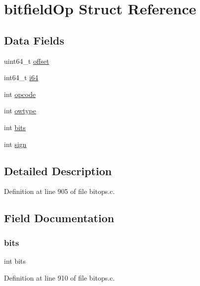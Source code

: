 \hypertarget{structbitfield_op}{}\section{bitfield\+Op Struct Reference}
\label{structbitfield_op}
\subsection*{Data Fields}
\begin{DoxyCompactItemize}
\item 
uint64\+\_\+t \hyperlink{structbitfield_op_a612bb2807d848cca89ea1437cceea886}{offset}
\item 
int64\+\_\+t \hyperlink{structbitfield_op_a35a9b0adab9f7ddb672b720854e419be}{i64}
\item 
int \hyperlink{structbitfield_op_aff3af4fae5174de7c7e40ec004999ca0}{opcode}
\item 
int \hyperlink{structbitfield_op_a9ed5a15ccd67f24e83836aa6b0830fd8}{owtype}
\item 
int \hyperlink{structbitfield_op_ad1e28a1a66a25529b0b61b9ca4e66d44}{bits}
\item 
int \hyperlink{structbitfield_op_abbeb8ae63622a7fef0b5a56bb91a1682}{sign}
\end{DoxyCompactItemize}


\subsection{Detailed Description}


Definition at line 905 of file bitops.\+c.



\subsection{Field Documentation}
\mbox{\label{structbitfield_op_ad1e28a1a66a25529b0b61b9ca4e66d44}} 
\subsubsection{\texorpdfstring{bits}{bits}}
{\footnotesize\ttfamily int bits}



Definition at line 910 of file bitops.\+c.

\mbox{\label{structbitfield_op_a35a9b0adab9f7ddb672b720854e419be}} 
